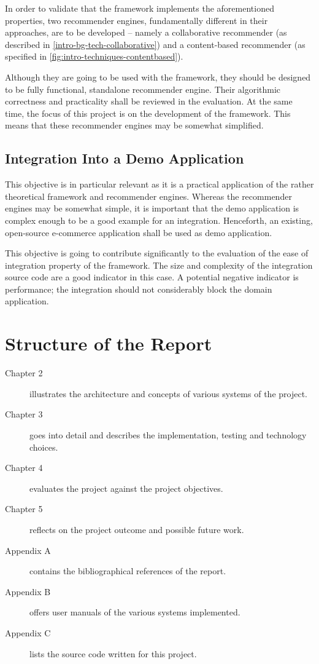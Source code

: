 In order to validate that the framework implements the aforementioned properties, two recommender engines, fundamentally different in their approaches, are to be developed -- namely a collaborative recommender (as described in \ref{intro-bg-tech-collaborative}) and a content-based recommender (as specified in \ref{fig:intro-techniques-contentbased}).

Although they are going to be used with the framework, they should be designed to be fully functional, standalone recommender engine. Their algorithmic correctness and practicality shall be reviewed in the evaluation. At the same time, the focus of this project is on the development of the framework. This means that these recommender engines may be somewhat simplified.

\subsection{Integration Into a Demo Application}
\label{intro-objectives-demo}

This objective is in particular relevant as it is a practical application of the rather theoretical framework and recommender engines. Whereas the recommender engines may be somewhat simple, it is important that the demo application is complex enough to be a good example for an integration. Henceforth, an existing, open-source e-commerce application shall be used as demo application.

This objective is going to contribute significantly to the evaluation of the ease of integration property of the framework. The size and complexity of the integration source code are a good indicator in this case. A potential negative indicator is performance; the integration should not considerably block the domain application.

\section{Structure of the Report}

\begin{description}
    \item[Chapter 2] illustrates the architecture and concepts of various systems of the project.
    \item[Chapter 3] goes into detail and describes the implementation, testing and technology choices.
    \item[Chapter 4] evaluates the project against the project objectives.
    \item[Chapter 5] reflects on the project outcome and possible future work.
    \item[Appendix A] contains the bibliographical references of the report.
    \item[Appendix B] offers user manuals of the various systems implemented.
    \item[Appendix C] lists the source code written for this project.
\end{description}